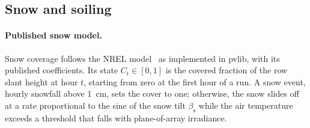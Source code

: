 \documentclass[11pt]{article}
\begin{document}
\subsection{Snow and soiling}
\label{sec:states}

\paragraph{Published snow model.}
Snow coverage follows the NREL model~\cite{marionMeasuredPhotovoltaicSystem2013,rybergIntegrationValidationApplication2017} as implemented in pvlib, with its published coefficients. Its state $C_t\in[0,1]$ is the covered fraction of the row slant height at hour $t$, starting from zero at the first hour of a run. A snow event, hourly snowfall above 1~cm, sets the cover to one; otherwise, the snow slides off at a rate proportional to the sine of the snow tilt $\beta_{\mathrm{s}}$ while the air temperature exceeds a threshold that falls with plane-of-array irradiance.
\end{document}

